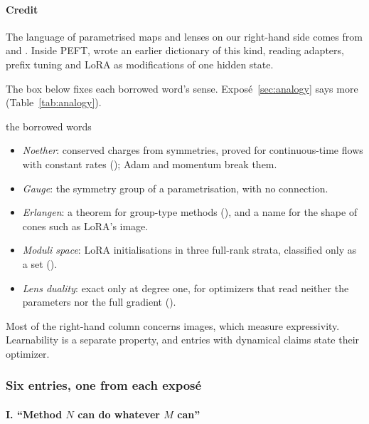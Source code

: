 \paragraph{Credit}
The language of parametrised maps and lenses on our right-hand side comes from \citet{fong2017backprop} and
\citet{cruttwell2021categorical}. Inside PEFT, \citet{he2021unified} wrote an earlier dictionary of this kind, reading
adapters, prefix tuning and LoRA as modifications of one hidden state.

The box below fixes each borrowed word's sense. Exposé~\ref{sec:analogy} says more
(Table~\ref{tab:analogy}).

\begingroup\renewcommand{\label}[1]{}%
\begin{analogy*}{the borrowed words}
\begin{itemize}
  \item \emph{Noether}: conserved charges from symmetries, proved for continuous-time flows with constant rates
    (); Adam and momentum break them.
  \item \emph{Gauge}: the symmetry group of a parametrisation, with no connection.
  \item \emph{Erlangen}: a theorem for group-type methods (), and a name for the shape of cones
    such as LoRA's image.
  \item \emph{Moduli space}: LoRA initialisations in three full-rank strata, classified only as a set
    ().
  \item \emph{Lens duality}: exact only at degree one, for optimizers that read neither the parameters nor the full
    gradient ().
\end{itemize}
\end{analogy*}
\endgroup

Most of the right-hand column concerns images, which measure expressivity. Learnability is a separate property, and
entries with dynamical claims state their optimizer.

\subsubsection{Six entries, one from each exposé}\label{sec:rosetta-six}

\paragraph{I. ``Method $N$ can do whatever $M$ can''}

